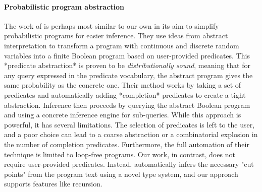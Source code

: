 \paragraph{Probabilistic program abstraction}
The work of \cite{Holtzen2018Abstraction} is perhaps most similar to our own in its aim to simplify probabilistic programs for easier inference.
They use ideas from abstract interpretation to transform a program with continuous and discrete random variables into a finite Boolean program based on user-provided predicates.
This *predicate abstraction* is proven to be \emph{distributionally sound}, meaning that for any query expressed in the predicate vocabulary, the abstract program gives the same probability as the concrete one.
Their method works by taking a set of predicates and automatically adding *completion* predicates to create a tight abstraction.
Inference then proceeds by querying the abstract Boolean program and using a concrete inference engine for sub-queries.
While this approach is powerful, it has several limitations.
The selection of predicates is left to the user, and a poor choice can lead to a coarse abstraction or a combinatorial explosion in the number of completion predicates.
Furthermore, the full automation of their technique is limited to loop-free programs.
Our work, in contrast, does not require user-provided predicates. Instead, \Slice{} automatically infers the necessary "cut points" from the program text using a novel type system, and our approach supports features like recursion.


